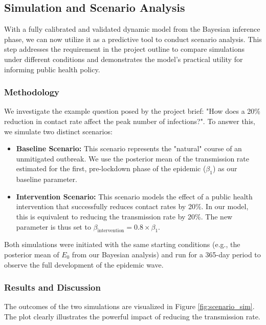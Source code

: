 \documentclass[12pt, a4paper]{article}
\begin{document}
\subsection{Simulation and Scenario Analysis}
With a fully calibrated and validated dynamic model from the Bayesian inference phase, we can now utilize it as a predictive tool to conduct scenario analysis. This step addresses the requirement in the project outline to compare simulations under different conditions and demonstrates the model's practical utility for informing public health policy.

\subsubsection{Methodology}
We investigate the example question posed by the project brief: "How does a 20\% reduction in contact rate affect the peak number of infections?". To answer this, we simulate two distinct scenarios:
\begin{itemize}
    \item \textbf{Baseline Scenario:} This scenario represents the "natural" course of an unmitigated outbreak. We use the posterior mean of the transmission rate estimated for the first, pre-lockdown phase of the epidemic ($\beta_1$) as our baseline parameter.
    \item \textbf{Intervention Scenario:} This scenario models the effect of a public health intervention that successfully reduces contact rates by 20\%. In our model, this is equivalent to reducing the transmission rate by 20\%. The new parameter is thus set to $\beta_{\text{intervention}} = 0.8 \times \beta_1$.
\end{itemize}
Both simulations were initiated with the same starting conditions (e.g., the posterior mean of $E_0$ from our Bayesian analysis) and run for a 365-day period to observe the full development of the epidemic wave.

\subsubsection{Results and Discussion}
The outcomes of the two simulations are visualized in Figure \ref{fig:scenario_sim}. The plot clearly illustrates the powerful impact of reducing the transmission rate.
\end{document}
